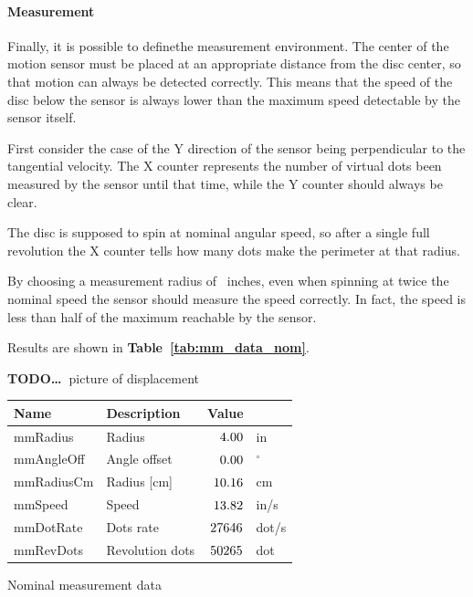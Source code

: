 \documentclass[a4paper,10pt]{article}
\makeatletter
\newenvironment{tablehere}{\def\@captype{table}\vspace{2ex}}{\vspace{2ex}}
\newcommand{\TODO}{\textbf{TODO\dots\ }}
\newcommand{\citet}[1]{\textbf{Table~\ref{#1}}}
\makeatother
\begin{document}
\begin{multicols}{2}
\paragraph{Measurement}
Finally, it is possible to definethe measurement environment. The center of
the motion sensor must be placed at an appropriate distance from the disc
center, so that motion can always be detected correctly. This means that the
speed of the disc below the sensor is always lower than the maximum speed
detectable by the sensor itself.

First consider the case of the Y direction of the sensor being perpendicular
to the tangential velocity. The X counter represents the number of virtual
dots been measured by the sensor until that time, while the Y counter should
always be clear.

The disc is supposed to spin at nominal angular speed, so after a single full
revolution the X counter tells how many dots make the perimeter at that
radius.

By choosing a measurement radius of \mmRadius\  inches, even when spinning at
twice the nominal speed the sensor should measure the speed correctly. In
fact, the speed is less than half of the maximum reachable by the sensor.

Results are shown in \citet{tab:mm_data_nom}.

\TODO picture of displacement

\begin{tablehere}
\centering \footnotesize
\begin{tabular}{|l|l|rl|}
\hline
\textbf{Name} & \textbf{Description} & \textbf{Value} &	\\
\hline
mmRadius		& Radius				& $4.00$		& in			\\
mmAngleOff		& Angle offset			& $0.00$		& $^{\circ}$	\\
\hline
mmRadiusCm		& Radius [cm]			& $10.16$		& cm			\\
mmSpeed			& Speed					& $13.82$		& in/s			\\
mmDotRate		& Dots rate				& $27646$		& dot/s			\\
mmRevDots		& Revolution dots		& $50265$		& dot			\\
\hline
\end{tabular}
\caption{Nominal measurement data}
\label{tab:mm_data_nom}
\end{tablehere}



\end{multicols}
\end{document}
